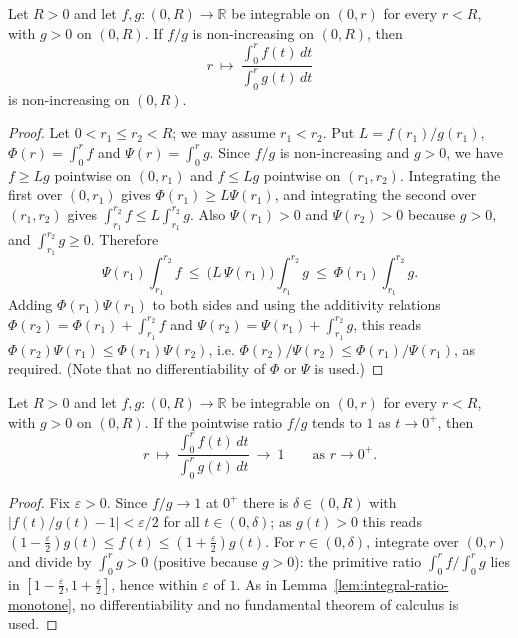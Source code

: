 \begin{lemma}
\label{lem:integral-ratio-monotone}
\leanok


Let $R>0$ and let $f,g\colon(0,R)\to\mathbb R$ be integrable on $(0,r)$ for
every $r<R$, with $g>0$ on $(0,R)$. If $f/g$ is non-increasing on $(0,R)$,
then
$$r\ \longmapsto\ \frac{\int_0^rf(t)\,dt}{\int_0^rg(t)\,dt}$$
is non-increasing on $(0,R)$.
\end{lemma}

\begin{proof}
\sketch
\leanok
Let $0<r_1\le r_2<R$; we may assume $r_1<r_2$. Put $L=f(r_1)/g(r_1)$,
$\Phi(r)=\int_0^rf$ and $\Psi(r)=\int_0^rg$. Since $f/g$ is non-increasing and
$g>0$, we have $f\ge Lg$ pointwise on $(0,r_1)$ and $f\le Lg$ pointwise on
$(r_1,r_2)$. Integrating the first over $(0,r_1)$ gives $\Phi(r_1)\ge L\Psi(r_1)$,
and integrating the second over $(r_1,r_2)$ gives
$\int_{r_1}^{r_2}f\le L\int_{r_1}^{r_2}g$. Also $\Psi(r_1)>0$ and
$\Psi(r_2)>0$ because $g>0$, and $\int_{r_1}^{r_2}g\ge0$. Therefore
$$\Psi(r_1)\int_{r_1}^{r_2}f\ \le\ \bigl(L\,\Psi(r_1)\bigr)\int_{r_1}^{r_2}g
\ \le\ \Phi(r_1)\int_{r_1}^{r_2}g .$$
Adding $\Phi(r_1)\Psi(r_1)$ to both sides and using the additivity relations
$\Phi(r_2)=\Phi(r_1)+\int_{r_1}^{r_2}f$ and
$\Psi(r_2)=\Psi(r_1)+\int_{r_1}^{r_2}g$, this reads
$\Phi(r_2)\Psi(r_1)\le\Phi(r_1)\Psi(r_2)$, i.e.
$\Phi(r_2)/\Psi(r_2)\le\Phi(r_1)/\Psi(r_1)$, as required. (Note that no
differentiability of $\Phi$ or $\Psi$ is used.)
\end{proof}

\begin{lemma}
\label{lem:integral-ratio-normalized}
\leanok


Let $R>0$ and let $f,g\colon(0,R)\to\mathbb R$ be integrable on $(0,r)$ for
every $r<R$, with $g>0$ on $(0,R)$. If the pointwise ratio $f/g$ tends to $1$
as $t\to0^+$, then
$$r\ \longmapsto\ \frac{\int_0^rf(t)\,dt}{\int_0^rg(t)\,dt}\ \longrightarrow\ 1
\qquad\text{as }r\to0^+.$$
\end{lemma}

\begin{proof}
\sketch
\leanok
Fix $\varepsilon>0$. Since $f/g\to1$ at $0^+$ there is $\delta\in(0,R)$ with
$|f(t)/g(t)-1|<\varepsilon/2$ for all $t\in(0,\delta)$; as $g(t)>0$ this reads
$(1-\tfrac\varepsilon2)g(t)\le f(t)\le(1+\tfrac\varepsilon2)g(t)$. For
$r\in(0,\delta)$, integrate over $(0,r)$ and divide by $\int_0^rg>0$ (positive
because $g>0$): the primitive ratio $\int_0^rf/\int_0^rg$ lies in
$[1-\tfrac\varepsilon2,1+\tfrac\varepsilon2]$, hence within $\varepsilon$ of $1$.
As in Lemma~\ref{lem:integral-ratio-monotone}, no differentiability and no
fundamental theorem of calculus is used.
\end{proof}

